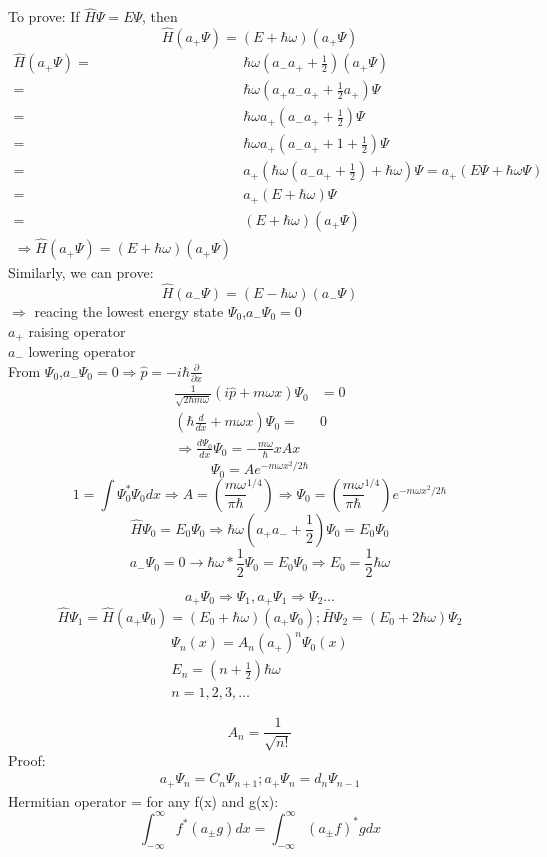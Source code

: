 \documentclass[12pt, a4paper]{article}
\begin{document}
To prove: If $\hat{H}\Psi=E\Psi$, then 
$$\hat{H}(a_+\Psi)=(E+\hbar\omega)(a_+\Psi)$$
\begin{align*}
\hat{H}(a_+\Psi)=&\hbar\omega(a_-a_+ + \frac{1}{2})(a_+\Psi)\\
=&\hbar\omega(a_+a_-a_++\frac{1}{2}a_+)\Psi\\
=&\hbar\omega a_+(a_-a_++\frac{1}{2})\Psi\\
=&\hbar\omega a_+(a_-a_++1+\frac{1}{2})\Psi\\
=&a_+(\hbar\omega(a_-a_++\frac{1}{2})+\hbar\omega)\Psi=a_+(E\Psi+\hbar\omega\Psi)\\
=&a_+(E+\hbar\omega)\Psi\\
=&(E+\hbar\omega)(a_+\Psi)\\
\Rightarrow \hat{H}(a_+\Psi)=(E+\hbar\omega)(a_+\Psi)
\end{align*}
Similarly, we can prove:
$$\hat{H}(a_-\Psi)=(E-\hbar\omega)(a_-\Psi)$$
$\Rightarrow$ reacing the lowest energy state $\Psi_0$,$a_-\Psi_0=0$\\
$a_+$ raising operator\\
$a_-$ lowering operator\\
From $\Psi_0$,$a_-\Psi_0=0\Rightarrow \hat{p}=-i\hbar\frac{\partial}{\partial x}$
\begin{align*}
\frac{1}{\sqrt{2\hbar m \omega}}(i\hat{p}+m\omega x)\Psi_0&=0\\
(\hbar\frac{d}{dx}+m\omega x)\Psi_0=&0\\
\Rightarrow \frac{d\Psi_0}{dx}\Psi_0=-\frac{m\omega}{\hbar}xAx
\end{align*}
$$\Psi_0=Ae^{-m\omega x^2/2\hbar}$$
$$1=\int \Psi_0^*\Psi_0dx \Rightarrow A=(\frac{m\omega}{\pi\hbar}^{1/4})\Rightarrow \Psi_0=(\frac{m\omega}{\pi\hbar}^{1/4})e^{-m\omega x^2/2\hbar}$$
$$\hat{H}\Psi_0=E_0\Psi_0 \Rightarrow \hbar\omega(a_+a_-+\frac{1}{2})\Psi_0=E_0\Psi_0$$
$$a_-\Psi_0=0\rightarrow \hbar\omega * \frac{1}{2}\Psi_0=E_0\Psi_0\Rightarrow E_0=\frac{1}{2}\hbar\omega$$


$$a_+\Psi_0\Rightarrow \Psi_1, a_+\Psi_1\Rightarrow \Psi_2 \hdots$$
$$\hat{H}\Psi_1=\hat{H}(a_+\Psi_0)=(E_0+\hbar\omega)(a_+\Psi_0);\bar{H}\Psi_2=(E_0+2\hbar\omega)\Psi_2$$
\begin{align*}
\Psi_n(x)=A_n(a_+)^n\Psi_0(x)\\
E_n=(n+\frac{1}{2})\hbar\omega\\
n=1,2,3,\hdots
\end{align*}

$$A_n=\frac{1}{\sqrt{n!}}$$
Proof: 
\begin{align*}
a_+\Psi_n=C_n\Psi_{n+1};a_+\Psi_n=d_n\Psi_{n-1}
\end{align*}
Hermitian operator = for any f(x) and g(x):
$$\int_{-\infty}^{\infty}f^*(a_{\pm} g)dx=\int_{-\infty}^{\infty}(a_{\pm}f)^*gdx$$
\end{document}
